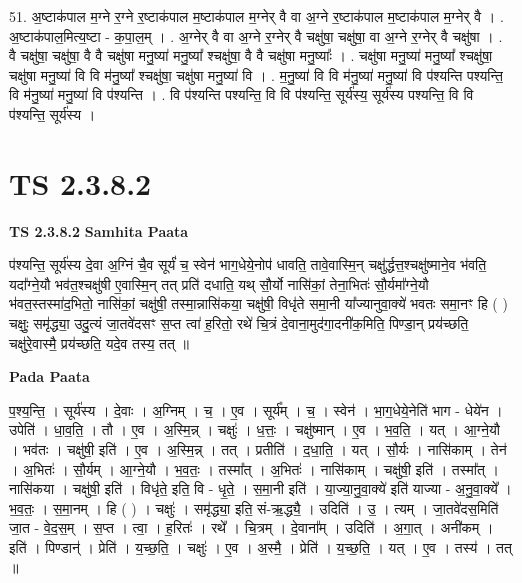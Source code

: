 \documentclass[17pt]{extarticle}
\begin{document}
51. अ॒ष्टाक॑पाल म॒ग्ने र॒ग्ने र॒ष्टाक॑पाल म॒ष्टाक॑पाल म॒ग्नेर् वै वा अ॒ग्ने र॒ष्टाक॑पाल म॒ष्टाक॑पाल म॒ग्नेर् वै । . अ॒ष्टाक॑पाल॒मित्य॒ष्टा - क॒पा॒ल॒म् । . अ॒ग्नेर् वै वा अ॒ग्ने र॒ग्नेर् वै चक्षु॑षा॒ चक्षु॑षा॒ वा अ॒ग्ने र॒ग्नेर् वै चक्षु॑षा । . वै चक्षु॑षा॒ चक्षु॑षा॒ वै वै चक्षु॑षा मनु॒ष्या॑ मनु॒ष्या᳚ श्चक्षु॑षा॒ वै वै चक्षु॑षा मनु॒ष्याः᳚ । . चक्षु॑षा मनु॒ष्या॑ मनु॒ष्या᳚ श्चक्षु॑षा॒ चक्षु॑षा मनु॒ष्या॑ वि वि म॑नु॒ष्या᳚ श्चक्षु॑षा॒ चक्षु॑षा मनु॒ष्या॑ वि । . म॒नु॒ष्या॑ वि वि म॑नु॒ष्या॑ मनु॒ष्या॑ वि प॑श्यन्ति पश्यन्ति॒ वि म॑नु॒ष्या॑ मनु॒ष्या॑ वि प॑श्यन्ति । . वि प॑श्यन्ति पश्यन्ति॒ वि वि प॑श्यन्ति॒ सूर्य॑स्य॒ सूर्य॑स्य पश्यन्ति॒ वि वि प॑श्यन्ति॒ सूर्य॑स्य । \newline
\pagebreak
{}

\section{ TS 2.3.8.2 }

\textbf{TS 2.3.8.2 } \newline
\textbf{Samhita Paata} \newline

प॑श्यन्ति॒ सूर्य॑स्य दे॒वा अ॒ग्निं चै॒व सूर्यं॑ च॒ स्वेन॑ भाग॒धेये॒नोप॑ धावति॒ तावे॒वास्मि॒न् चक्षु॑र्द्धत्त॒श्चक्षु॑ष्माने॒व भ॑वति॒ यदा᳚ग्ने॒यौ भव॑त॒श्चक्षु॑षी ए॒वास्मि॒न् तत् प्रति॑ दधाति॒ यथ् सौ॒र्यो नासि॑कां॒ तेना॒भितः॑ सौ॒र्यमा᳚ग्ने॒यौ भ॑वत॒स्तस्मा॑द॒भितो॒ नासि॑कां॒ चक्षु॑षी॒ तस्मा॒न्नासि॑कया॒ चक्षु॑षी॒ विधृ॑ते समा॒नी या᳚ज्यानुवा॒क्ये॑ भवतः समा॒नꣳ हि ( ) चक्षुः॒ समृ॑द्ध्या॒ उदु॒त्यं जा॒तवे॑दसꣳ स॒प्त त्वा॑ ह॒रितो॒ रथे॑ चि॒त्रं दे॒वाना॒मुद॑गा॒दनी॑क॒मिति॒ पिण्डा॒न् प्रय॑च्छति॒ चक्षु॑रे॒वास्मै॒ प्रय॑च्छति॒ यदे॒व तस्य॒ तत् ॥ \newline

\textbf{Pada Paata} \newline

प॒श्य॒न्ति॒ । सूर्य॑स्य । दे॒वाः । अ॒ग्निम् । च॒ । ए॒व । सूर्य᳚म् । च॒ । स्वेन॑ । भा॒ग॒धेये॒नेति॑ भाग - धेये॑न । उपेति॑ । धा॒व॒ति॒ । तौ । ए॒व । अ॒स्मि॒न्न् । चक्षुः॑ । ध॒त्तः॒ । चक्षु॑ष्मान् । ए॒व । भ॒व॒ति॒ । यत् । आ॒ग्ने॒यौ । भव॑तः । चक्षु॑षी॒ इति॑ । ए॒व । अ॒स्मि॒न्न् । तत् । प्रतीति॑ । द॒धा॒ति॒ । यत् । सौ॒र्यः । नासि॑काम् । तेन॑ । अ॒भितः॑ । सौ॒र्यम् । आ॒ग्ने॒यौ । भ॒व॒तः॒ । तस्मा᳚त् । अ॒भितः॑ । नासि॑काम् । चक्षु॑षी॒ इति॑ । तस्मा᳚त् । नासि॑कया । चक्षु॑षी॒ इति॑ । विधृ॑ते॒ इति॒ वि - धृ॒ते॒ । स॒मा॒नी इति॑ । या॒ज्या॒नु॒वा॒क्ये॑ इति॑ याज्या - अ॒नु॒वा॒क्ये᳚ । भ॒व॒तः॒ । स॒मा॒नम् । हि ( ) । चक्षुः॑ । समृ॑द्ध्या॒ इति॒ सं-ऋ॒द्ध्यै॒ । उदिति॑ ।   उ॒ । त्यम् । जा॒तवे॑दस॒मिति॑ जा॒त - वे॒द॒स॒म् । स॒प्त । त्वा॒ । ह॒रितः॑ । रथे᳚ । चि॒त्रम् । दे॒वाना᳚म् । उदिति॑ । अ॒गा॒त् । अनी॑कम् । इति॑ । पिण्डान्॑ । प्रेति॑ । य॒च्छ॒ति॒ । चक्षुः॑ । ए॒व । अ॒स्मै॒ । प्रेति॑ । य॒च्छ॒ति॒ । यत् । ए॒व । तस्य॑ । तत् ॥  \newline
\end{document}
